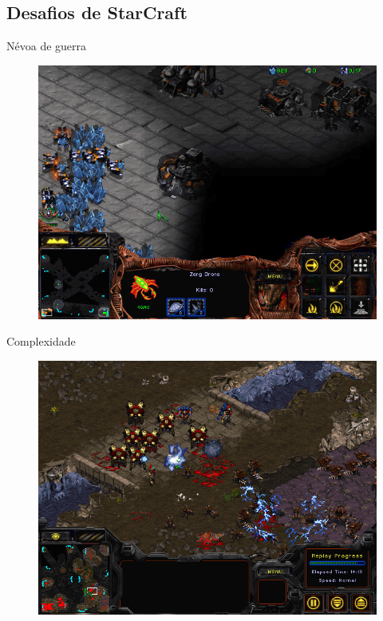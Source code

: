 \documentclass{beamer}
\begin{document}
\subsection{Desafios de StarCraft}
\begin{frame}{Névoa de guerra}
\begin{figure}[H]
  \centering
  \includegraphics[scale=0.4]{Imagens/fow.jpg}
  \label{fig:fow}
\end{figure}
\end{frame}

\begin{frame}{Complexidade}
\begin{figure}
  \centering
  \includegraphics[scale=0.4]{Imagens/combat.jpg}
  \label{fig:sc}
\end{figure}
\end{frame}
\end{document}
